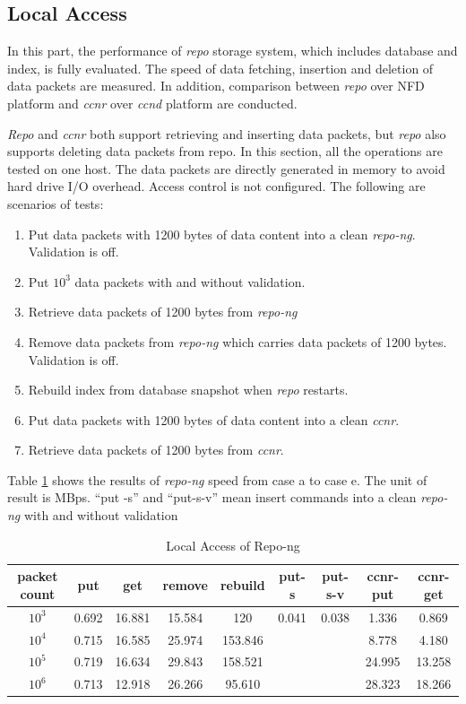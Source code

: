 \documentclass[conference]{IEEEtran}
\begin{document}
\subsection{Local Access}
In this part, the performance of \emph{repo} storage system, which includes database and index, is fully evaluated. The speed of data fetching, insertion and deletion of data packets are measured. In addition, comparison between \emph{repo} over NFD platform and \emph{ccnr} over \emph{ccnd} platform are conducted.

\emph{Repo} and \emph{ccnr} both support retrieving and inserting data packets, but \emph{repo} also supports deleting data packets from repo. In this section, all the operations are tested on one host. The data packets are directly generated in memory to avoid hard drive I/O overhead. Access control is not configured. The following are scenarios of tests:

\begin{enumerate}[a]
\item Put data packets with 1200 bytes of data content into a clean \emph{repo-ng}. Validation is off.
\item Put $10^3$ data packets with and without validation.
\item Retrieve data packets of 1200 bytes from \emph{repo-ng}
\item Remove data packets from \emph{repo-ng} which carries data packets of 1200 bytes. Validation is off.
\item Rebuild index from database snapshot when \emph{repo} restarts.
\item Put data packets with 1200 bytes of data content into a clean \emph{ccnr}.
\item Retrieve data packets of 1200 bytes from \emph{ccnr}.
\end{enumerate}

Table \ref{local-repo} shows the results of \emph{repo-ng} speed from case a to case e. The unit of result is MBps. ``put -s'' and ``put-s-v'' mean insert commands into a clean \emph{repo-ng} with and without validation

\begin{table}[htbp]
\centering
\caption{Local Access of Repo-ng}
\label{local-repo}
\begin{tabular}{ | c | c | c | c | c | c | c | c | c | }
    \hline
    packet count & put & get & remove & rebuild & put-s & put-s-v & ccnr-put & ccnr-get \\ \hline
    $10^3$ & 0.692 & 16.881 & 15.584 & 120 & 0.041 & 0.038  & 1.336 & 0.869\\ \hline
    $10^4$ & 0.715 & 16.585 & 25.974 & 153.846 & & & 8.778 & 4.180 \\ \hline
    $10^5$ & 0.719 & 16.634 & 29.843 & 158.521 & & & 24.995 & 13.258 \\ \hline
    $10^6$ & 0.713 & 12.918 & 26.266 & 95.610 & & & 28.323 & 18.266\\ \hline
\end{tabular}
\end{table}
\end{document}
